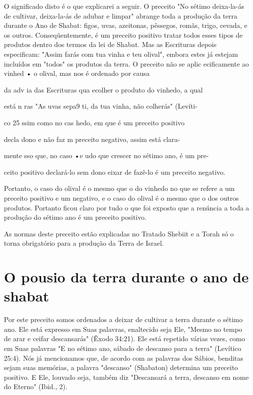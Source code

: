 \begin{itemize}
\begin{enumrate}
\begin{itemize}
\begin{itemize}
\begin{itemize}
O significado disto é o que explicarei a seguir. O preceito "No séti­mo
deixa-la-ás de cultivar, deixa-la-ás de adubar e limpar" abrange toda a
pro­dução da terra durante o Ano de Shabat: figos, uvas, azeitonas,
pêssegos, ro­mãs, trigo, cevada, e os outros. Conseqüentemente, é um
preceito positivo tra­tar todos esses tipos de produtos dentro dos
termos da lei de Shabat. Mas as Escrituras depois especificam: "Assim
farás com tua vinha e teu olival", embo­ra estes já estejam incluídos em
"todos" os produtos da terra. O preceito não se aplic ecificamente ao
vinhed • o olival, mas nos é ordenado por causa

da adv ia das Escrituras qua ecolher o produto do vinhedo, a qual

está n ras "As uvas sepa9 ti, da tua vinha, não colherás" (Levíti-

co 25 ssim como no cas hedo, em que é um preceito positivo

decla dono e não faz m preceito negativo, assim está clara-

mente sso que, no caso •e udo que crescer no sétimo ano, é um pre-

ceito positivo declará-lo sem dono eixar de fazê-lo é um preceito
negativo.

Portanto, o caso do olival é o mesmo que o do vinhedo no que se refere a
um preceito positivo e um negativo, e o caso do olival é o mesmo que o
dos outros produtos. Portanto ficou claro por tudo o que foi exposto que
a renúncia a toda a produção do sétimo ano é um preceito positivo.

As normas deste preceito estão explicadas no Tratado Shebiit e a To­rah
só o torna obrigatório para a produção da Terra de Israel.

\section{O pousio da terra durante o ano de shabat}

Por este preceito somos ordenados a deixar de cultivar a terra du­rante
o sétimo ano. Ele está expresso em Suas palavras, enaltecido seja Ele,
"Mes­mo no tempo de arar e ceifar descansarás" (Êxodo 34:21). Ele está
repetido vá­rias vezes, como em Suas palavras "E no sétimo ano, sábado
de descanso para a terra" (Levítico 25:4). Nós já mencionamos que, de
acordo com as palavras dos Sábios, benditas sejam suas memórias, a
palavra "descanso" (Shabaton) de­termina um preceito positivo. E Ele,
louvado seja, também diz "Descansará a terra, descanso em nome do
Eterno" (Ibid., 2).


\end{itemize}
\end{itemize}
\end{itemize}
\end{enumrate}
\end{itemize}
